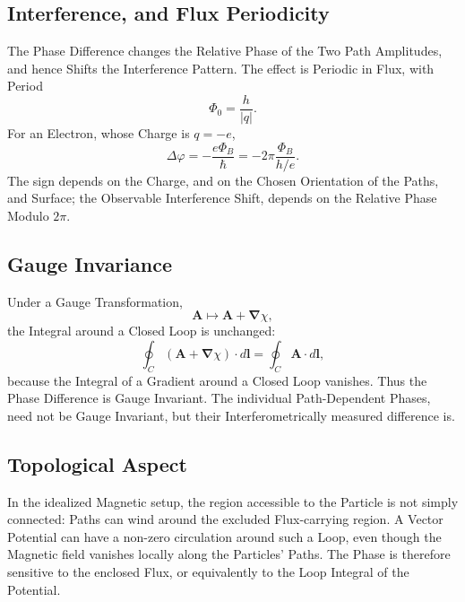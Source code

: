 \documentclass[a4paper, 10pt, onepage]{elegantbook}
\begin{document}
\subsection{Interference, and Flux Periodicity}

The Phase Difference changes the Relative Phase of the Two Path Amplitudes, and hence Shifts the Interference Pattern. The effect is Periodic in Flux, with Period
\begin{equation}
\Phi_0=\frac{h}{|q|}.
\end{equation}
For an Electron, whose Charge is \(q=-e\),
\begin{equation}
\Delta\varphi
=
-\frac{e\Phi_B}{\hbar}
=
-2\pi\frac{\Phi_B}{h/e}.
\end{equation}
The sign depends on the Charge, and on the Chosen Orientation of the Paths, and Surface; the Observable Interference Shift, depends on the
Relative Phase Modulo \(2\pi\).

\subsection{Gauge Invariance}

Under a Gauge Transformation,
\begin{equation}
\mathbf{A}\longmapsto\mathbf{A}+\boldsymbol{\nabla}\chi,
\end{equation}
the Integral around a Closed Loop is unchanged:
\begin{equation}
\oint_C(\mathbf{A}+\boldsymbol{\nabla}\chi)\cdot d\mathbf{l}
=
\oint_C\mathbf{A}\cdot d\mathbf{l},
\end{equation}
because the Integral of a Gradient around a Closed Loop vanishes. Thus the Phase Difference is Gauge Invariant. The individual Path-Dependent Phases, need not be Gauge Invariant, but their Interferometrically measured difference is.

\subsection{Topological Aspect}

In the idealized Magnetic setup, the region accessible to the Particle is not simply connected: Paths can wind around the excluded Flux-carrying region. A Vector Potential can have a non-zero circulation around such a Loop, even though the Magnetic field vanishes locally along the Particles' Paths. The Phase is therefore sensitive to the
enclosed Flux, or equivalently to the Loop Integral of the Potential.
\end{document}
